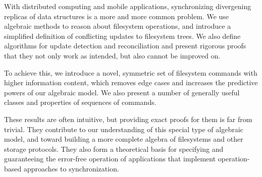 
With distributed computing and mobile applications,
synchronizing divergening replicas of data structures is a more and more common problem.
We use algebraic methods to reason about filesystem operations, 
and introduce a simplified definition of conflicting updates to filesystem trees.
We also define algorithms for update detection and reconciliation
and present rigorous proofs that they not only work as intended,
but also cannot be improved on.

To achieve this, we introduce a novel, symmetric set of filesystem commands
with higher information content,
which removes edge cases
and increases the predictive powers of our algebraic model.
We also present a number of generally useful classes and properties
of sequences of commands.

These results are often intuitive,
but providing exact proofs for them is far from trivial.
They contribute to our understanding of this special type of algebraic model,
and toward building a more complete algebra
of filesystems and other storage protocols.
They also form a theoretical basis for
specifying
and guaranteeing the error-free operation
of applications that implement operation-based approaches to synchronization.
